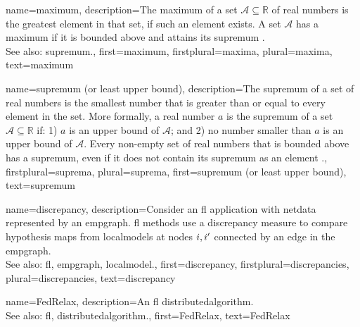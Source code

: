 {name={maximum},
	description={The maximum of a set $\mathcal{A} \subseteq \mathbb{R}$ 
     		of real numbers is the greatest element in that set, if such an element exists. A set $\mathcal{A}$ 
     		has a maximum if it is bounded above and attains its \gls{supremum} \cite[Sec.~1.4]{RudinBookPrinciplesMatheAnalysis}.
				\\ 
		See also: \gls{supremum}.},
 	first={maximum},
 	firstplural={maxima},
 	plural={maxima},
 	text={maximum}
}

{name={supremum (or least upper bound)},
	description={The supremum of a set of real numbers is 
		the smallest number that is greater than or equal to every element in the set. More formally, a 
		real number $a$ is the supremum of a set $\mathcal{A} \subseteq \mathbb{R}$ if: 1) $a$ 
		is an upper bound of $\mathcal{A}$; and 2) no number smaller than $a$ is an upper bound of $\mathcal{A}$. 
		Every non-empty set of real numbers that is bounded above has a supremum, even if it does 
		not contain its supremum as an element \cite[Sec.~1.4]{RudinBookPrinciplesMatheAnalysis}.},
	firstplural={suprema}, 
  	plural={suprema},
	first={supremum (or least upper bound)},
	text={supremum}
}

{name={discrepancy},
	description={Consider an \gls{fl} application with \gls{netdata} 
		represented by an \gls{empgraph}. \gls{fl} methods use a discrepancy measure 
		to compare \gls{hypothesis} \glspl{map} from \glspl{localmodel} at nodes $i,i'$ 
		connected by an edge in the \gls{empgraph}.
					\\ 
		See also: \gls{fl}, \gls{empgraph}, \gls{localmodel}.},
	first={discrepancy},
	firstplural={discrepancies}, 
  	plural={discrepancies}, 
	text={discrepancy}
}

{name={FedRelax},
	description={An \gls{fl} \gls{distributedalgorithm}. 
		\\ 
		See also: \gls{fl}, \gls{distributedalgorithm}.},
	first={FedRelax},
	text={FedRelax}
} 

